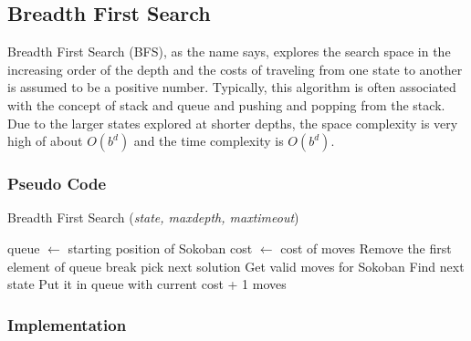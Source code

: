 \subsection{Breadth First Search}
\noindent Breadth First Search (BFS), as the name says, explores the search space in the increasing order of the depth and the costs of traveling from one state to another is assumed to be a positive number. Typically, this algorithm is often associated with the concept of stack and queue and pushing and popping from the stack. Due to the larger states explored at shorter depths, the space complexity is very high of about $O(b^d)$ and the time complexity is $O(b^d)$.

\subsubsection{Pseudo Code}
\begin{algorithm}[H]
	\caption{Breadth First Search (\textit{state, maxdepth, maxtimeout})}
	\label{alg:bfs}
	\begin{algorithmic}[1]
	\State queue $\gets$ starting position of Sokoban
	\State cost $\gets$ cost of moves
		\State Remove the first element of queue
			\State break
		\Else
				\State pick next solution
			\Else
				\State Get valid moves for Sokoban
					\State Find next state
					\State Put it in queue with current cost + 1
				\EndFor
			\EndIf
		\EndIf
	\EndWhile
	\State \Return moves
	\end{algorithmic}
\end{algorithm}

\subsubsection{Implementation}